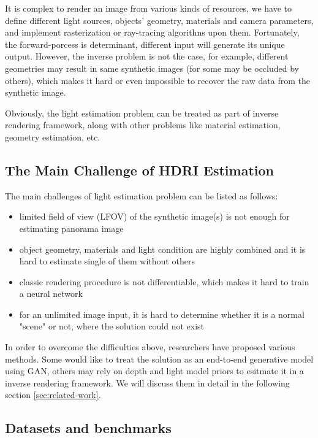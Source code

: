 \documentclass{article}
\begin{document}
It is complex to render an image from various kinds of resources, we have to define different light sources,
objects' geometry, materials and camera parameters, and implement rasterization or ray-tracing algorithns upon them.
Fortunately, the forward-porcess is determinant, different input will generate its unique output.
However, the inverse problem is not the case, for example, different geometries may result in same
synthetic images (for some may be occluded by others),
which makes it hard or even impossible to recover the raw data from the synthetic image.



Obviously, the light estimation problem can be treated as part of inverse rendering framework,
along with other problems like material estimation, geometry estimation, etc.

\subsection{The Main Challenge of HDRI Estimation}

The main challenges of light estimation problem can be listed as follows:
\begin{itemize}
    \item limited field of view (LFOV) of the synthetic image(s) is not enough for estimating panorama image
    \item object geometry, materials and light condition are highly combined and it is hard to estimate single of them without others
    \item classic rendering procedure is not differentiable, which makes it hard to train a neural network
    \item for an unlimited image input, it is hard to determine whether it is a normal "scene" or not, where the solution could not exist
\end{itemize}

In order to overcome the difficulties above, researchers have proposed various methods.
Some would like to treat the solution as an end-to-end generative model using GAN, others
may rely on depth and light model priors to esitmate it in a inverse rendering framework.
We will discuss them in detail in the following section \ref{sec:related-work}.

\subsection{Datasets and benchmarks}
\end{document}
